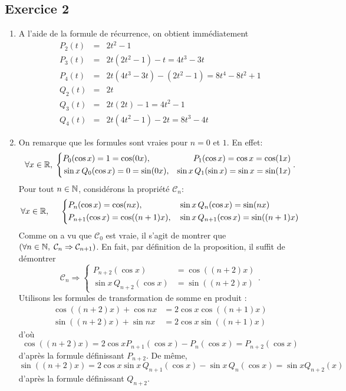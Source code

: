 \subsection*{Exercice 2}
\begin{enumerate}
\item  A l'aide de la formule de r{\'e}currence, on obtient
imm{\'e}diatement
\begin{eqnarray*}
P_{2}(t) &=&2t^{2}-1 \\
P_{3}(t) &=&2t(2t^{2}-1)-t=4t^{3}-3t \\
P_{4}(t) &=&2t(4t^{3}-3t)-(2t^{2}-1)=8t^{4}-8t^{2}+1 \\
Q_{2}(t) &=&2t \\
Q_{3}(t) &=&2t(2t)-1=4t^{2}-1 \\
Q_{4}(t) &=&2t(4t^{2}-1)-2t=8t^{3}-4t
\end{eqnarray*}

\item  On remarque que les formules sont vraies pour $n=0$ et $1$. En effet:
\[
\forall x \in \mathbb{R}, \; 
\left\lbrace
\begin{aligned}
  &P_0(\cos x) = 1 = \cos(0x), &P_1(\cos x) = \cos x = \cos(1x) \\
  &\sin x \,Q_0(\cos x) = 0 = \sin(0x), &\sin x \, Q_1(\sin x) = \sin x = \sin(1x) 
\end{aligned}
\right. .
\]
Pour tout $n\in \mathbb{N}$, considérons la propriété $\mathcal{C}_n$:
\[
  \forall x \in \mathbb{R}, \hspace{0.5cm}
  \left\lbrace
    \begin{aligned}
      &P_{n}(\cos x) = \cos (nx),& &\sin x\,Q_{n}(\cos x)=\sin (nx) \\
      &P_{n+1}(\cos x) = \cos ((n+1)x),& &\sin x\,Q_{n+1}(\cos x) = \sin ((n+1)x)
    \end{aligned}
  \right.
\]
Comme on a vu que $\mathcal{C}_0$ est vraie, il s'agit de montrer que $\left( \forall n \in \mathbb{N}, \; \mathcal{C}_n \Rightarrow \mathcal{C}_{n+1}\right)$. En fait, par définition de la proposition, il suffit de démontrer
\[
  \mathcal{C}_n \Rightarrow
  \left\lbrace
  \begin{aligned}
    P_{n+2}(\cos x)         &= \cos ((n+2)x) \\
    \sin x\,Q_{n+2}(\cos x) &= \sin ((n+2)x)
  \end{aligned}
  \right. .
\]
Utilisons les formules de transformation de somme en produit :
\[
\begin{aligned}
\cos ((n+2)x)+\cos nx &= 2\cos x\cos ((n+1)x) \\
\sin ((n+2)x)+\sin nx &= 2\cos x\sin ((n+1)x)
\end{aligned}
\]
d'o{\`u}
\[
\cos ((n+2)x)=2\cos xP_{n+1}(\cos x)-P_{n}(\cos x)=P_{n+2}(\cos x)
\]
d'apr{\`e}s la formule d{\'e}finissant $P_{n+2}$. De m{\^e}me,
\[
\sin ((n+2)x)=2\cos x\sin x\,Q_{n+1}(\cos x)-\sin x\,Q_{n}(\cos
x)=\sin xQ_{n+2}(x)
\]
d'apr{\`e}s la formule d{\'e}finissant $Q_{n+2}$.


\end{enumerate}
